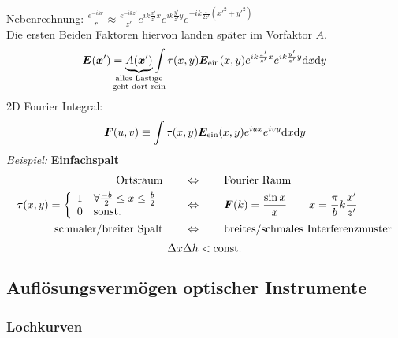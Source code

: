 Nebenrechnung: $ \frac{e^{-ikr}}{r} \approx \frac{e^{-ikz'}}{z'} e^{ik\frac{x'}{z'}x} e^{ik\frac{y'}{z'}y} e^{-ik \frac{1}{2 z'} (x'^2 + y'^2)} $\\
Die ersten Beiden Faktoren hiervon landen später im Vorfaktor $ A $.
\begin{equation*}
\vec{E}(\vec{x}') = \ub{A(\vec{x}')}_{\mathclap{\substack{\tx{alles Lästige} \\ \tx{geht dort rein}}}} \int \tau(x,y) \vec{E}_{\tx{ein}}(x,y) e^{i k \frac{x'}{z'} x} e^{ik\frac{y'}{z'}y} \dd x \dd y
\end{equation*}
2D Fourier Integral:
\begin{equation*}
\bm{F} (u,v) \equiv \int \tau(x,y) \bm{E}_{\textrm{ein}} (x,y) e^{iux} e^{ivy} \textrm{d} x \textrm{d} y
\end{equation*}
\noindent
\emph{Beispiel:} \textbf{Einfachspalt}
\begin{align*}
\textrm{Ortsraum} \qquad &\Leftrightarrow \qquad \textrm{Fourier Raum}\\
\tau(x,y) = \left\{ \begin{array}{ll} {1} & {\forall  \frac{-b}{2} \le x \le \frac{b}{2}} \\ {0} & {\textrm{sonst.}} \end{array} \right. \qquad &\Leftrightarrow \qquad \bm{F}(k) = \frac{\sin x}{x} \qquad x = \frac{\pi}{b} k \frac{x'}{z'}\\
\textrm{schmaler/breiter Spalt} \qquad &\Leftrightarrow \qquad \textrm{breites/schmales Interferenzmuster}
\end{align*}
\begin{equation*}
\Delta x \Delta h < \textrm{const.}
\end{equation*}

\subsection{Auflösungsvermögen optischer Instrumente}


\subsubsection{Lochkurven}

\\

